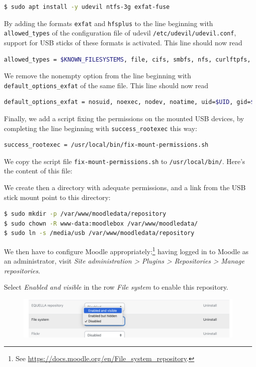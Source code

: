 \documentclass[12pt]{article}
\begin{document}
\begin{lstlisting}[language=bash]
$ sudo apt install -y udevil ntfs-3g exfat-fuse
\end{lstlisting}
By adding the formats \lstinline{exfat} and \lstinline{hfsplus} to the line beginning with \lstinline{allowed_types} of the configuration file of udevil \lstinline{/etc/udevil/udevil.conf}, support for USB sticks of these formats is activated.
This line should now read
\begin{lstlisting}[language=bash]
allowed_types = $KNOWN_FILESYSTEMS, file, cifs, smbfs, nfs, curlftpfs, ftpfs, sshfs, davfs, tmpfs, ramfs, exfat, hfsplus
\end{lstlisting}
We remove the nonempty option from the line beginning with \lstinline{default_options_exfat} of the same file.
This line should now read
\begin{lstlisting}[language=bash]
default_options_exfat = nosuid, noexec, nodev, noatime, uid=$UID, gid=$GID, iocharset=utf8
\end{lstlisting}
Finally, we add a script fixing the permissions on the mounted USB devices, by completing the line beginning with \lstinline{success_rootexec} this way:
\begin{lstlisting}[language=bash]
success_rootexec = /usr/local/bin/fix-mount-permissions.sh
\end{lstlisting}
We copy the script file \lstinline{fix-mount-permissions.sh} to \lstinline{/usr/local/bin/}.
Here's the content of this file:


We create then a directory with adequate permissions, and a link from the USB stick mount point to this directory:
\begin{lstlisting}[language=bash]
$ sudo mkdir -p /var/www/moodledata/repository
$ sudo chown -R www-data:moodlebox /var/www/moodledata/
$ sudo ln -s /media/usb /var/www/moodledata/repository
\end{lstlisting}

We then have to configure Moodle appropriately:\footnote{See \url{https://docs.moodle.org/en/File_system_repository}.}
having logged in to Moodle as an administrator, visit \emph{Site administration > Plugins > Repositories > Manage repositories}.

Select \emph{Enabled and visible} in the row \emph{File system} to enable this repository.
\begin{figure}[!ht]
\begin{minipage}[b]{\linewidth}\centering
\includegraphics[width=13cm]{repo-filesystem-usb-1.png}
\end{minipage}
\end{figure}
\end{document}
